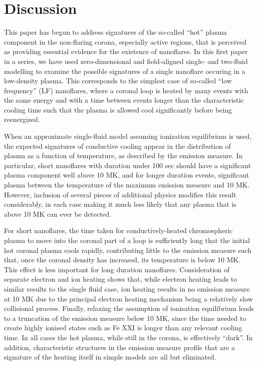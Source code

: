\documentclass[apj]{emulateapj}
\begin{document}
	\section{Discussion}
	\label{sec:discussion}
	\par This paper has begun to address signatures of the so-called ``hot'' plasma component in the non-flaring corona, especially active regions, that is perceived as providing essential evidence for the existence of nanoflares. In this first paper in a series, we have used zero-dimensional and field-aligned single- and two-fluid modelling to examine the possible signatures of a single nanoflare occuring in a low-density plasma. This corresponds to the simplest case of so-called ``low frequency'' (LF) nanoflares, where a coronal loop is heated by many events with the same energy and with a time between events longer than the characteristic cooling time such that the plasma is allowed cool significantly before being reenergized.
\par When an approximate single-fluid model assuming ionization equilibrium is used, the expected signatures of conductive cooling appear in the distribution of plasma as a function of temperature, as described by the emission measure. In particular, short nanoflares with duration under 100 sec should have a significant plasma component well above 10 MK, and for longer duration events, significant plasma between the temperature of the maximum emission measure and 10 MK. However, inclusion of several pieces of additional physics modifies this result considerably, in each case making it much less likely that any plasma that is above 10 MK can ever be detected.
%
\par For short nanoflares, the time taken for conductively-heated chromospheric plasma to move into the coronal part of a loop is sufficiently long that the initial hot coronal plasma cools rapidly, contributing little to the emission measure such that, once the coronal density has increased, its temperature is below 10 MK. This effect is less important for long duration nanoflares. Consideration of separate electron and ion heating shows that, while electron heating leads to similar results to the single fluid case, ion heating results in no emission measure at 10 MK due to the principal electron heating mechanism being a relatively slow collisional process. Finally, relaxing the assumption of ionisation equilibrium leads to a truncation of the emission measure below 10 MK, since the time needed to create highly ionised states such as Fe XXI is longer than any relevant cooling time. In all cases the hot plasma, while still in the corona, is effectively ``dark''. In addition, characteristic structures in the emission measure profile that are a signature of the heating itself in simple models are all but eliminated.
\end{document}
